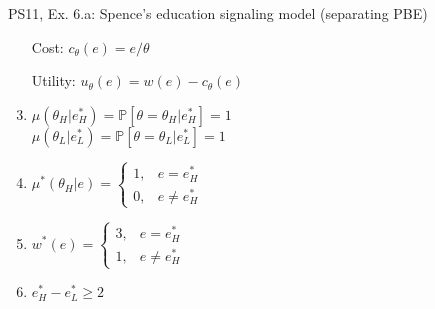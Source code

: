 \begin{frame}{PS11, Ex. 6.a: Spence’s education signaling model (separating PBE)}
\begin{multicols}{2}
\begin{enumerate}
        \item[Cost:] \vspace{-2pt}$c_\theta(e)=e/\theta$
        \item[Utility:] \vspace{-2pt}$u_\theta(e)=w(e)-c_\theta(e)$
        \item \vspace{-2pt}$\mu\left(\theta_H|e_H^*\right)=
               \mathbb{P}\left[\theta=\theta_H|e_H^*\right]=1$\\
              $\mu\left(\theta_L|e_L^*\right)=
               \mathbb{P}\left[\theta=\theta_L|e_L^*\right]=1$
        \item \vspace{-2pt}$\mu^*(\theta_H|e)=\left\{\begin{array}{ll}
                  1, & e = e_H^* \\
                  0, & e \neq e_H^*
               \end{array}\right.$
        \item \vspace{-2pt}$w^*(e)=\left\{\begin{array}{ll}
                  3, & e = e_H^* \\
                  1, & e \neq e_H^*
               \end{array}\right.$
        \item \vspace{-2pt}$e_H^*-e_L^*\geq2$
      \end{enumerate}
      \vfill\null
    \end{multicols}
\end{frame}
